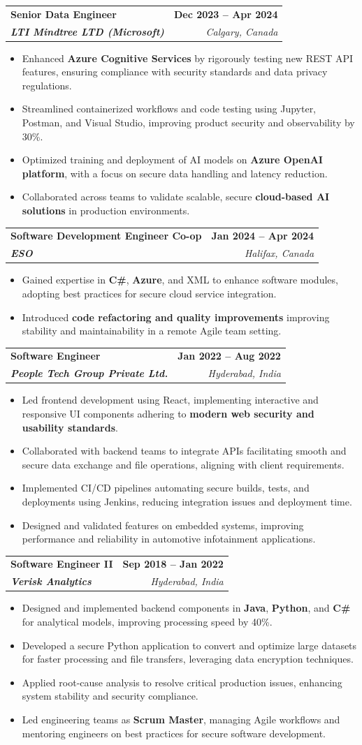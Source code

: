 \documentclass[letterpaper,11pt]{article}
\makeatletter
\newcommand{\resumeItem}[1]{
  \item\small{
    {#1 \vspace{-2pt}}
  }
}
\newcommand{\resumeSubheading}[4]{
  \vspace{-2pt}\item
    \begin{tabular*}{1.0\textwidth}[t]{l@{\extracolsep{\fill}}r}
      \textbf{#1} & \textbf{\small #2} \\
      \textit{\small#3} & \textit{\small #4} \\
    \end{tabular*}\vspace{-7pt}
}
\newcommand{\resumeItemListStart}{\begin{itemize}}
\newcommand{\resumeItemListEnd}{\end{itemize}\vspace{-5pt}}
\makeatother
\begin{document}
    \resumeSubheading
      {\textbf{Senior Data Engineer}}{\textbf{Dec 2023 -- Apr 2024}}
      {\textbf{LTI Mindtree LTD (Microsoft)}}{Calgary, Canada}
      \resumeItemListStart
        \resumeItem{Enhanced \textbf{Azure Cognitive Services} by rigorously testing new REST API features, ensuring compliance with security standards and data privacy regulations.}
        \resumeItem{Streamlined containerized workflows and code testing using Jupyter, Postman, and Visual Studio, improving product security and observability by 30\%.}
        \resumeItem{Optimized training and deployment of AI models on \textbf{Azure OpenAI platform}, with a focus on secure data handling and latency reduction.}
        \resumeItem{Collaborated across teams to validate scalable, secure \textbf{cloud-based AI solutions} in production environments.}
      \resumeItemListEnd
    
    \resumeSubheading
      {\textbf{Software Development Engineer Co-op}}{\textbf{Jan 2024 -- Apr 2024}}
      {\textbf{ESO}}{Halifax, Canada}
      \resumeItemListStart
        \resumeItem{Gained expertise in \textbf{C\#}, \textbf{Azure}, and XML to enhance software modules, adopting best practices for secure cloud service integration.}
        \resumeItem{Introduced \textbf{code refactoring and quality improvements} improving stability and maintainability in a remote Agile team setting.}
      \resumeItemListEnd

    \resumeSubheading
      {\textbf{Software Engineer}}{\textbf{Jan 2022 -- Aug 2022}}
      {\textbf{People Tech Group Private Ltd.}}{Hyderabad, India}
      \resumeItemListStart
        \resumeItem{Led frontend development using React, implementing interactive and responsive UI components adhering to \textbf{modern web security and usability standards}.}
        \resumeItem{Collaborated with backend teams to integrate APIs facilitating smooth and secure data exchange and file operations, aligning with client requirements.}
        \resumeItem{Implemented CI/CD pipelines automating secure builds, tests, and deployments using Jenkins, reducing integration issues and deployment time.}
        \resumeItem{Designed and validated features on embedded systems, improving performance and reliability in automotive infotainment applications.}
      \resumeItemListEnd

    \resumeSubheading
      {\textbf{Software Engineer II}}{\textbf{Sep 2018 -- Jan 2022}}
      {\textbf{Verisk Analytics}}{Hyderabad, India}
      \resumeItemListStart
        \resumeItem{Designed and implemented backend components in \textbf{Java}, \textbf{Python}, and \textbf{C\#} for analytical models, improving processing speed by 40\%.}
        \resumeItem{Developed a secure Python application to convert and optimize large datasets for faster processing and file transfers, leveraging data encryption techniques.}
        \resumeItem{Applied root-cause analysis to resolve critical production issues, enhancing system stability and security compliance.}
        \resumeItem{Led engineering teams as \textbf{Scrum Master}, managing Agile workflows and mentoring engineers on best practices for secure software development.}
      \resumeItemListEnd
\end{document}
